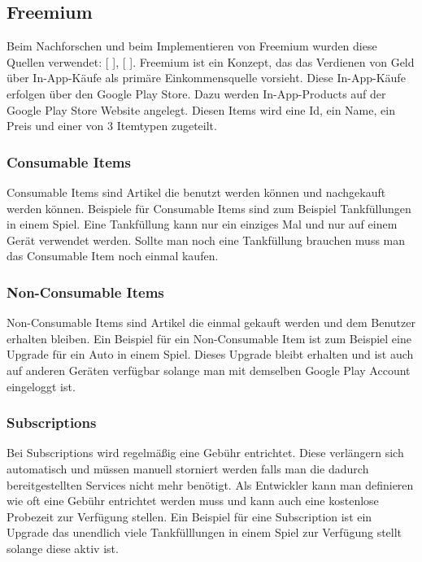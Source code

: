 \documentclass[FIPLY_base.tex]{subfiles}
\author{Andreas Denkmayr}
\date{25. Februar 2016}
\begin{document}
\subsection{Freemium}
Beim Nachforschen und beim Implementieren von Freemium wurden diese Quellen verwendet: [ \cite{yFreemium}], [ \cite{adAdministerBilling}]. \newline
Freemium ist ein Konzept, das das Verdienen von Geld über In-App-Käufe als primäre Einkommensquelle vorsieht.
Diese In-App-Käufe erfolgen über den Google Play Store. \newline
Dazu werden In-App-Products auf der Google Play Store Website angelegt.
Diesen Items wird eine Id, ein Name, ein Preis und einer von 3 Itemtypen zugeteilt. 

\subsubsection{Consumable Items}
Consumable Items sind Artikel die benutzt werden können und nachgekauft werden können. 
Beispiele für Consumable Items sind zum Beispiel Tankfüllungen in einem Spiel.
Eine Tankfüllung kann nur ein einziges Mal und nur auf einem Gerät verwendet werden. Sollte man noch eine Tankfüllung brauchen muss man das Consumable Item noch einmal kaufen. 

\subsubsection{Non-Consumable Items} 
Non-Consumable Items sind Artikel die einmal gekauft werden und dem Benutzer erhalten bleiben.
Ein Beispiel für ein Non-Consumable Item ist zum Beispiel eine Upgrade für ein Auto in einem Spiel.
Dieses Upgrade bleibt erhalten und ist auch auf anderen Geräten verfügbar solange man mit demselben Google Play Account eingeloggt ist. 

\subsubsection{Subscriptions}
Bei Subscriptions wird regelmäßig eine Gebühr entrichtet.
Diese verlängern sich automatisch und müssen manuell storniert werden falls man die dadurch bereitgestellten Services nicht mehr benötigt.
Als Entwickler kann man definieren wie oft eine Gebühr entrichtet werden muss und kann auch eine kostenlose Probezeit zur Verfügung stellen. 
Ein Beispiel für eine Subscription ist ein Upgrade das unendlich viele Tankfülllungen in einem Spiel zur Verfügung stellt solange diese aktiv ist.
\end{document}
